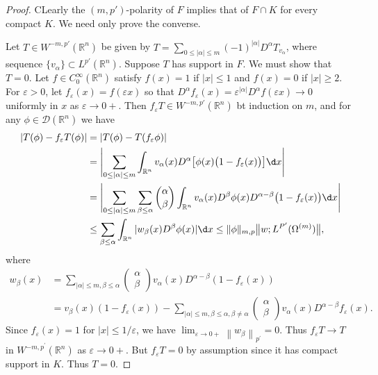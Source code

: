\begin{proof}
  CLearly the $(m,p')$-polarity of $F$ implies that of $F\cap K$
  for every compact $K$. We need only prove the converse.

  Let $T\in W^{-m,p'}(\mathbb{R}^n)$ be given by $T  = \sum_{0\leq |\alpha|\leq m} (-1)^{|\alpha|}
  D^\alpha T_{v_{\alpha}}$, where sequence $\{v_\alpha\}\subset L^{p'}(\mathbb{R}^n)$.
  Suppose $T$ has support in $F$. We must show that $T = 0$.
  Let $f\in C_0^\infty(\mathbb{R}^n)$ satisfy $f(x) = 1$ if $|x|\leq 1$
  and $f(x) = 0$ if $|x|\geq 2$. For $\varepsilon > 0$, let $f_\varepsilon (x) = f(\varepsilon x)$
  so that $D^\alpha f_\varepsilon (x) = \varepsilon^{|\alpha|} D^\alpha f(\varepsilon x)\to 0$
  uniformly in $x$ as $\varepsilon\to 0+$.
  Then $f_\varepsilon T \in W^{-m,p'}(\mathbb{R}^n)$ bt induction on $m$,
  and for any $\phi\in\mathscr{D}(\mathbb{R}^n)$ we have
  \begin{align*}
    |T(\phi) - f_\varepsilon T(\phi)|
    & = |T(\phi) - T(f_\varepsilon \phi)| \\
    & = \Biggl|\sum_{0\leq |\alpha|\leq m} \int_{\mathbb{R}^n} v_\alpha(x)
        D^\alpha \bigl[\phi(x)\bigl(1 - f_\varepsilon (x)\bigr)\bigr] \d x \Biggr| \\
    & = \Biggl|\sum_{0\leq |\alpha|\leq m} \sum_{\beta\leq\alpha}
        \binom{\alpha}{\beta} \int_{\mathbb{R}^n} v_\alpha(x)
        D^\beta \phi(x) D^{\alpha-\beta} \bigl(1 - f_\varepsilon(x)\bigr) \d x \Biggr| \\
    & \leq \sum_{\beta\leq\alpha} \int_{\mathbb{R}^n} |w_\beta (x) D^\beta \phi(x)| \d x
      \leq \|\phi\|_{m,p} \bigl\|w; L^{P'}(\Omega^{(m)}) \bigr\|,
  \end{align*}
  where
  \[
    \begin{aligned}
    w_\beta(x) & =\sum_{|\alpha| \leq m, \beta \leq \alpha}\left(\begin{array}{c}
    \alpha \\
    \beta
    \end{array}\right) v_\alpha(x) D^{\alpha-\beta}\left(1-f_\varepsilon(x)\right) \\
    & =v_\beta(x)\left(1-f_\varepsilon(x)\right)-\sum_{|\alpha| \leq m, \beta \leq \alpha, \beta \neq \alpha}\left(\begin{array}{c}
    \alpha \\
    \beta
    \end{array}\right) v_\alpha(x) D^{\alpha-\beta} f_\varepsilon(x) .
    \end{aligned}
  \]
  Since $f_\varepsilon(x)=1$ for $|x| \leq 1 / \varepsilon$, we have $\lim _{\varepsilon \rightarrow 0+}\left\|w_\beta\right\|_{p^{\prime}}=0$. Thus $f_\varepsilon T \rightarrow T$ in $W^{-m, p^{\prime}}\left(\mathbb{R}^n\right)$ as $\varepsilon \rightarrow 0+$. But $f_\varepsilon T=0$ by assumption since it has compact support in $K$. Thus $T=0$.
\end{proof}



